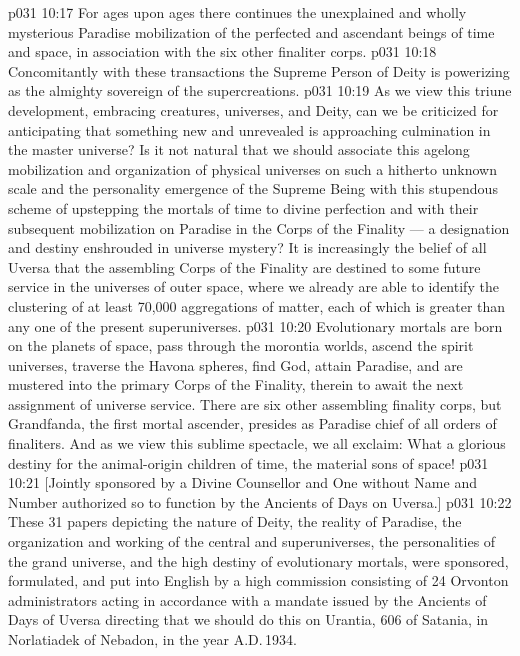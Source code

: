 \vs p031 10:17 \bibnobreakspace For ages upon ages there continues the unexplained and wholly mysterious Paradise mobilization of the perfected and ascendant beings of time and space, in association with the six other finaliter corps.
\vs p031 10:18 \bibnobreakspace Concomitantly with these transactions the Supreme Person of Deity is powerizing as the almighty sovereign of the supercreations.
\vs p031 10:19 \pc As we view this triune development, embracing creatures, universes, and Deity, can we be criticized for anticipating that something new and unrevealed is approaching culmination in the master universe? Is it not natural that we should associate this agelong mobilization and organization of physical universes on such a hitherto unknown scale and the personality emergence of the Supreme Being with this stupendous scheme of upstepping the mortals of time to divine perfection and with their subsequent mobilization on Paradise in the Corps of the Finality --- a designation and destiny enshrouded in universe mystery? It is increasingly the belief of all Uversa that the assembling Corps of the Finality are destined to some future service in the universes of outer space, where we already are able to identify the clustering of at least 70,000 aggregations of matter, each of which is greater than any one of the present superuniverses.
\vs p031 10:20 \pc Evolutionary mortals are born on the planets of space, pass through the morontia worlds, ascend the spirit universes, traverse the Havona spheres, find God, attain Paradise, and are mustered into the primary Corps of the Finality, therein to await the next assignment of universe service. There are six other assembling finality corps, but Grandfanda, the first mortal ascender, presides as Paradise chief of all orders of finaliters. And as we view this sublime spectacle, we all exclaim: What a glorious destiny for the animal\hyp{}origin children of time, the material sons of space!
\vsetoff
\vs p031 10:21 [Jointly sponsored by a Divine Counsellor and One without Name and Number authorized so to function by the Ancients of Days on Uversa.]
\separatorline
\vs p031 10:22 These 31 papers depicting the nature of Deity, the reality of Paradise, the organization and working of the central and superuniverses, the personalities of the grand universe, and the high destiny of evolutionary mortals, were sponsored, formulated, and put into English by a high commission consisting of 24 Orvonton administrators acting in accordance with a mandate issued by the Ancients of Days of Uversa directing that we should do this on Urantia, 606 of Satania, in Norlatiadek of Nebadon, in the year A.D.\,1934.
